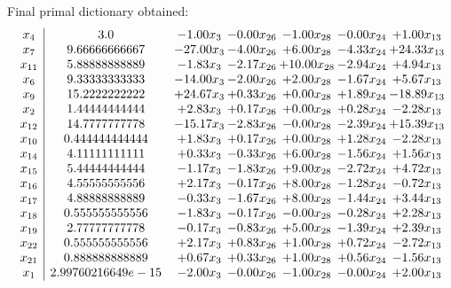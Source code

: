 \documentclass[8pt]{article}
\begin{document}
 Final primal dictionary obtained: 
\[\begin{array}{c| c c@{\hskip 2pt} c@{\hskip 2pt} c@{\hskip 2pt} c@{\hskip 2pt} c@{\hskip 2pt} }
 x_{4}   &  3.0 & -1.00 x_{3} & -0.00 x_{26} & -1.00 x_{28} & -0.00 x_{24} & +  1.00 x_{13}\\
 x_{7}   &  9.66666666667 & -27.00 x_{3} & -4.00 x_{26} & +  6.00 x_{28} & -4.33 x_{24} & + 24.33 x_{13}\\
 x_{11}   &  5.88888888889 & -1.83 x_{3} & -2.17 x_{26} & + 10.00 x_{28} & -2.94 x_{24} & +  4.94 x_{13}\\
 x_{6}   &  9.33333333333 & -14.00 x_{3} & -2.00 x_{26} & +  2.00 x_{28} & -1.67 x_{24} & +  5.67 x_{13}\\
 x_{9}   &  15.2222222222 & + 24.67 x_{3} & +  0.33 x_{26} & +  0.00 x_{28} & +  1.89 x_{24} & -18.89 x_{13}\\
 x_{2}   &  1.44444444444 & +  2.83 x_{3} & +  0.17 x_{26} & +  0.00 x_{28} & +  0.28 x_{24} & -2.28 x_{13}\\
 x_{12}   &  14.7777777778 & -15.17 x_{3} & -2.83 x_{26} & -0.00 x_{28} & -2.39 x_{24} & + 15.39 x_{13}\\
 x_{10}   &  0.444444444444 & +  1.83 x_{3} & +  0.17 x_{26} & +  0.00 x_{28} & +  1.28 x_{24} & -2.28 x_{13}\\
 x_{14}   &  4.11111111111 & +  0.33 x_{3} & -0.33 x_{26} & +  6.00 x_{28} & -1.56 x_{24} & +  1.56 x_{13}\\
 x_{15}   &  5.44444444444 & -1.17 x_{3} & -1.83 x_{26} & +  9.00 x_{28} & -2.72 x_{24} & +  4.72 x_{13}\\
 x_{16}   &  4.55555555556 & +  2.17 x_{3} & -0.17 x_{26} & +  8.00 x_{28} & -1.28 x_{24} & -0.72 x_{13}\\
 x_{17}   &  4.88888888889 & -0.33 x_{3} & -1.67 x_{26} & +  8.00 x_{28} & -1.44 x_{24} & +  3.44 x_{13}\\
 x_{18}   &  0.555555555556 & -1.83 x_{3} & -0.17 x_{26} & -0.00 x_{28} & -0.28 x_{24} & +  2.28 x_{13}\\
 x_{19}   &  2.77777777778 & -0.17 x_{3} & -0.83 x_{26} & +  5.00 x_{28} & -1.39 x_{24} & +  2.39 x_{13}\\
 x_{22}   &  0.555555555556 & +  2.17 x_{3} & +  0.83 x_{26} & +  1.00 x_{28} & +  0.72 x_{24} & -2.72 x_{13}\\
 x_{21}   &  0.888888888889 & +  0.67 x_{3} & +  0.33 x_{26} & +  1.00 x_{28} & +  0.56 x_{24} & -1.56 x_{13}\\
 x_{1}   &  2.99760216649e-15 & -2.00 x_{3} & -0.00 x_{26} & -1.00 x_{28} & -0.00 x_{24} & +  2.00 x_{13}\\

\end{array}\]
\end{document}
